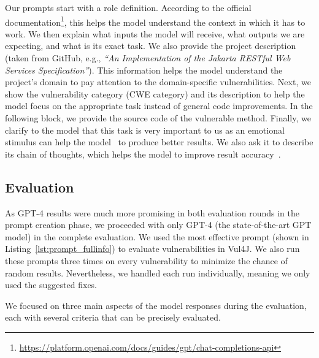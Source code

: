 Our prompts start with a role definition.
According to the official documentation\footnote{\url{https://platform.openai.com/docs/guides/gpt/chat-completions-api}}, this helps the model understand the context in which it has to work.
We then explain what inputs the model will receive, what outputs we are expecting, and what is its exact task.
We also provide the project description (taken from GitHub, e.g., \textit{``An Implementation of the Jakarta RESTful Web Services Specification''}).
This information helps the model understand the project's domain to pay attention to the domain-specific vulnerabilities.
Next, we show the vulnerability category (CWE category) and its description to help the model focus on the appropriate task instead of general code improvements.
In the following block, we provide the source code of the vulnerable method.
Finally, we clarify to the model that this task is very important to us as an emotional stimulus can help the model~\cite{li2023large} to produce better results.
We also ask it to describe its chain of thoughts, which helps the model to improve result accuracy~\cite{wei2022chain}.




\subsection{Evaluation}
\label{sec:methodology:evaluation}

As GPT-4 results were much more promising in both evaluation rounds in the prompt creation phase, we proceeded with only GPT-4 (the state-of-the-art GPT model) in the complete evaluation.
We used the most effective prompt (shown in Listing~\ref{lst:prompt_fullinfo}) to evaluate vulnerabilities in Vul4J.
We also run these prompts three times on every vulnerability to minimize the chance of random results.
Nevertheless, we handled each run individually, meaning we only used the \topone suggested fixes.

We focused on three main aspects of the model responses during the evaluation, each with several criteria that can be precisely evaluated.

